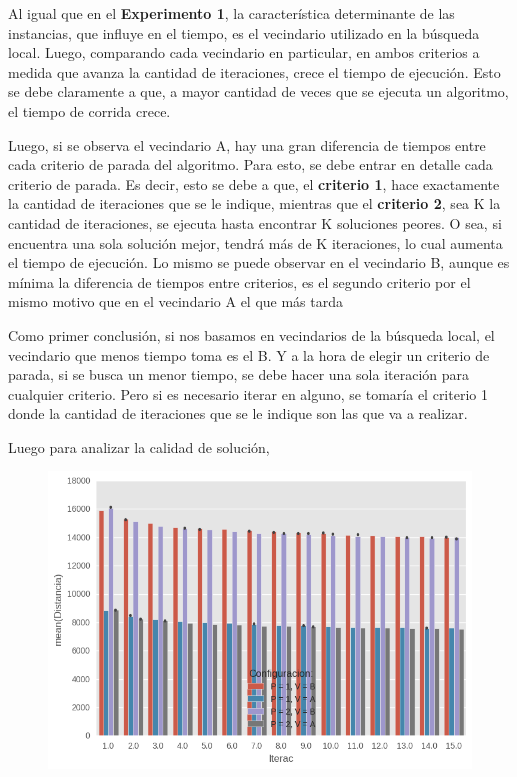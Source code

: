 Al igual que en el \textbf{Experimento 1}, la característica determinante de las instancias, que influye en el tiempo, es el vecindario utilizado en la búsqueda local. Luego, comparando cada vecindario en particular, en ambos criterios a medida que avanza la cantidad de iteraciones, crece el tiempo de ejecución. Esto se debe claramente a que, a mayor cantidad de veces que se ejecuta un algoritmo, el tiempo de corrida crece. 
\par Luego, si se observa el vecindario A, hay una gran diferencia de tiempos entre cada criterio de parada del algoritmo. Para esto, se debe entrar en detalle cada criterio de parada. Es decir, esto se debe a que, el \textbf{criterio 1}, hace exactamente la cantidad de iteraciones que se le indique, mientras que el \textbf{criterio 2}, sea K la cantidad de iteraciones, se ejecuta hasta encontrar K soluciones peores. O sea, si encuentra una sola solución mejor, tendrá más de K iteraciones, lo cual aumenta el tiempo de ejecución. Lo mismo se puede observar en el vecindario B, aunque es mínima la diferencia de tiempos entre criterios, es el segundo criterio por el mismo motivo que en el vecindario A el que más tarda
\par Como primer conclusión, si nos basamos en vecindarios de la búsqueda local, el vecindario que menos tiempo toma es el B. Y a la hora de elegir un criterio de parada, si se busca un menor tiempo, se debe hacer una sola iteración para cualquier criterio. Pero si es necesario iterar en alguno, se tomaría el criterio 1 donde la cantidad de iteraciones que se le indique son las que va a realizar.

\newpage
\par Luego para analizar la calidad de solución, 



\begin{figure}[H]
    \begin{center}
      \includegraphics[width=0.7\columnwidth]{imagenes/Ej4/ej4_exp2_Distancia.png}
    \end{center}
\end{figure}



